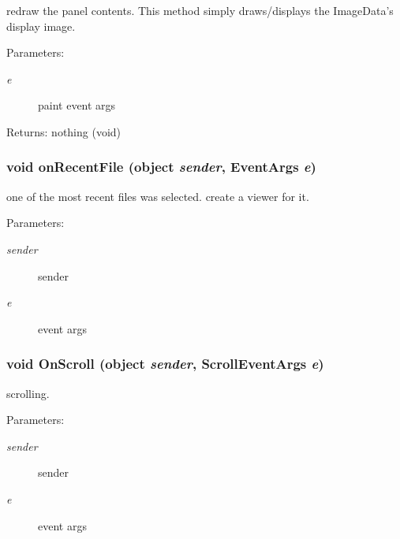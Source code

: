 redraw the panel contents. This method simply draws/displays the Image\-Data's display image. 

\begin{Desc}
\item[Parameters:]
\begin{description}
\item[{\em e}]paint event args \end{description}
\end{Desc}
\begin{Desc}
\item[Returns:]nothing (void) \end{Desc}
\subsubsection{\setlength{\rightskip}{0pt plus 5cm}void on\-Recent\-File (object {\em sender}, Event\-Args {\em e})\hspace{0.3cm}{\tt  [private]}}\label{class_c_s_image_viewer_1_1_c_s_image_viewer_901e4a44b87cc12abf2d8dfcaed623d4}


one of the most recent files was selected. create a viewer for it. 

\begin{Desc}
\item[Parameters:]
\begin{description}
\item[{\em sender}]sender \item[{\em e}]event args \end{description}
\end{Desc}
\subsubsection{\setlength{\rightskip}{0pt plus 5cm}void On\-Scroll (object {\em sender}, Scroll\-Event\-Args {\em e})\hspace{0.3cm}{\tt  [private]}}\label{class_c_s_image_viewer_1_1_c_s_image_viewer_4030669df2b2fa92fec0e187b32105f0}


scrolling. 

\begin{Desc}
\item[Parameters:]
\begin{description}
\item[{\em sender}]sender \item[{\em e}]event args \end{description}
\end{Desc}
